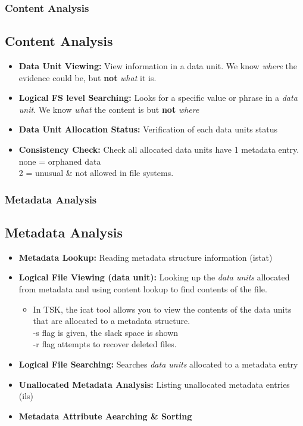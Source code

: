 \documentclass{beamer}
\begin{document}
\begin{frame}
\frametitle{Content Analysis}
\subsection*{Content Analysis}
	\begin{itemize}
		\item \textbf{Data Unit Viewing:} View information in a data unit. We know \textit{where} the evidence could be, but \textbf{not} \textit{what} it is.
		\item \textbf{Logical FS level Searching:} Looks for a specific value or phrase in a \textit{data unit}. We know \textit{what} the content is but \textbf{not} \textit{where}
		\item \textbf{Data Unit Allocation Status:} Verification of each data units status %
		\item \textbf{Consistency Check:} Check all allocated data units have 1 metadata entry.\\
		none = orphaned data\\
		2 = unusual {\&} not allowed in file systems.
    \end{itemize}
\end{frame}

\begin{frame}
\frametitle{Metadata Analysis}
\subsection*{Metadata Analysis}
	\begin{itemize}
		\item \textbf{Metadata Lookup:} Reading metadata structure information (istat)
		\item \textbf{Logical File Viewing (data unit):} Looking up the \textit{data units} allocated from metadata and using content lookup to find contents of the file.
			\begin{itemize}
				\item In TSK, the icat tool allows you to view the contents of the data units that are allocated to a metadata structure.\\ 
				-s flag is given, the slack space is shown\\
				-r flag attempts to recover deleted files.
			\end{itemize}
    		\item \textbf{Logical File Searching:} Searches \textit{data units} allocated to a metadata entry
    		\item \textbf{Unallocated Metadata Analysis:} Listing unallocated metadata entries (ils)
    		\item \textbf{Metadata Attribute Aearching {\&} Sorting}
    \end{itemize}
\end{frame}
\end{document}
